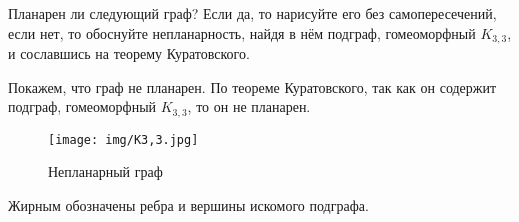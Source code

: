 \begin{task}{66}
Планарен ли следующий граф? Если да, то нарисуйте его без самопересечений, если нет, то обоснуйте непланарность, найдя в нём подграф, гомеоморфный \(K_{3,3}\), и сославшись на теорему Куратовского.
\end{task}

\begin{solution}
Покажем, что граф не планарен.
По теореме Куратовского, так как он содержит подграф, гомеоморфный \(K_{3,3}\), то он не планарен.

\begin{figure}[H]

\centering
\texttt{[image: img/K3,3.jpg]}
\caption{Непланарный граф}

\end{figure}

Жирным обозначены ребра и вершины искомого подграфа.

\end{solution}
